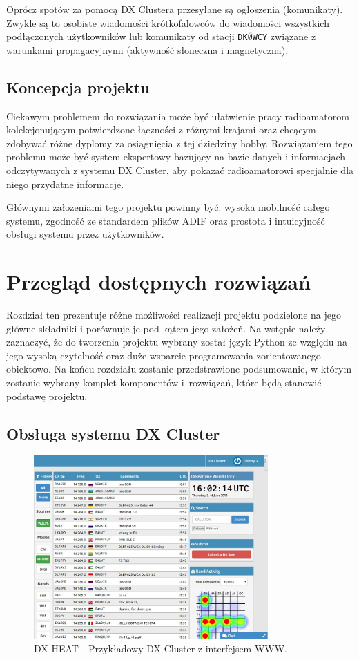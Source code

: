\documentclass[]{mgr}
\begin{document}
        Oprócz spotów za pomocą DX Clustera przesyłane są ogłoszenia (komunikaty). Zwykle są to osobiste wiadomości krótkofalowców do wiadomości wszystkich podłączonych użytkowników lub komunikaty od stacji \texttt{DK$\emptyset$WCY} związane z warunkami propagacyjnymi (aktywność słoneczna i magnetyczna).

        \section{Koncepcja projektu}
        \label{sec:problem_description}
        Ciekawym problemem do rozwiązania może być ułatwienie pracy radioamatorom kolekcjonującym potwierdzone łączności z różnymi krajami oraz chcącym zdobywać różne dyplomy za osiągnięcia z tej dziedziny hobby. Rozwiązaniem tego problemu może być system ekspertowy bazujący na bazie danych i informacjach odczytywanych z systemu DX Cluster, aby pokazać radioamatorowi specjalnie dla niego przydatne informacje.

        Głównymi założeniami tego projektu powinny być: wysoka mobilność całego systemu, zgodność ze standardem plików ADIF oraz prostota i intuicyjność obsługi systemu przez użytkowników.

    \chapter{Przegląd dostępnych rozwiązań}
    \label{sec:existing_possibilities}
    Rozdział ten prezentuje różne możliwości realizacji projektu podzielone na jego główne składniki i porównuje je pod kątem jego założeń. Na wstępie należy zaznaczyć, że do tworzenia projektu wybrany został język Python ze względu na jego wysoką czytelność oraz duże wsparcie programowania zorientowanego obiektowo. Na końcu rozdziału zostanie przedstrawione podsumowanie, w którym zostanie wybrany komplet komponentów i~rozwiązań, które będą stanowić podstawę projektu.

        \section{Obsługa systemu DX Cluster}
        \begin{figure}[hb]
            \centering
            \includegraphics[width=0.8\textwidth]{dxheat}
            \caption{DX HEAT - Przykładowy DX Cluster z interfejsem WWW.}
            \label{fig:dxheat}
        \end{figure}
\end{document}

